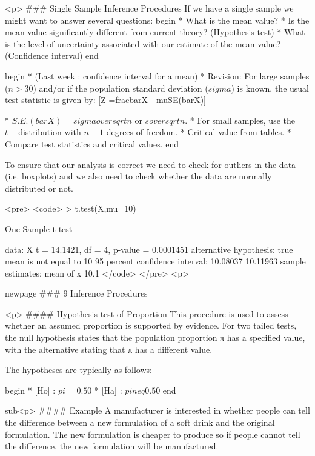 <p>
### {Single Sample Inference Procedures}
If we have a single sample we might want to answer several
questions:
begin{ }
	         * What is the mean value?          * Is the mean value
	significantly different from current theory? (Hypothesis test)
	         * What is the level of uncertainty associated with our
	estimate of the mean value? (Confidence interval)
end{ }

begin{ }
	         * (Last week : confidence interval for a mean)          * Revision:
	For large samples ($n > 30$) and/or if the population standard
	deviation ($sigma$) is known, the usual test statistic is given
	by: [Z =frac{bar{X} - mu}{SE(bar{X})}]
	
	         * $S.E.(bar{X}) = { sigma over sqrt{n}} $ or ${s over sqrt{n}}$. 
	         * For small samples, use the $t-$distribution with $n-1$ degrees of freedom.
	         * Critical value from tables.
	         * Compare test statistics and critical values.
end{ }

To ensure that our analysis is correct we need to check for
outliers in the data (i.e. boxplots) and we also need to check
whether the data are normally distributed or not.

<pre>
	<code>
	> t.test(X,mu=10)
	
	One Sample t-test
	
	data:  X 
	t = 14.1421, df = 4, p-value = 0.0001451
	alternative hypothesis: true mean is not equal to 10 
	95 percent confidence interval:
	10.08037 10.11963 
	sample estimates:
	mean of x 
	10.1 
	</code>
</pre>
<p>




newpage
###  9 Inference Procedures




<p>
#### {Hypothesis test of Proportion}
This procedure is used to assess whether an assumed proportion is supported by evidence. For two tailed tests, the null hypothesis states that the population proportion  π has a specified value, with the alternative stating that π has a different value. 

The hypotheses are typically as follows:   

begin{ }
	        * [Ho] : $pi = 0.50$
	        * [Ha] : $pi neq 0.50$
end{ }

sub<p>
#### {Example}
A manufacturer is interested in whether people can tell the difference between a new formulation of a soft drink and the original formulation. The new formulation is cheaper to produce so if people cannot tell the difference, the new formulation will be manufactured. 

